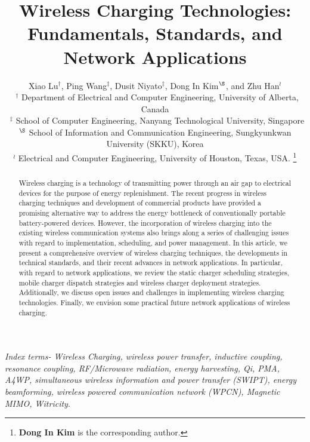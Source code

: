 \documentclass[twocolumn,10pt]{IEEEtran}
\begin{document}
\title{Wireless Charging Technologies: Fundamentals, Standards, and Network Applications}
 \author{ Xiao Lu$^{\dagger}$, Ping Wang$^{\ddagger}$,  Dusit Niyato$^{\ddagger}$, Dong In Kim$^{\S}$, and Zhu Han$^{\wr}$\\
 ~$^{\dagger}$ Department of Electrical and Computer Engineering, University of Alberta, Canada \\
    ~$^{\ddagger}$ School of Computer Engineering, Nanyang Technological University, Singapore \\
    $^{\S}$  School of Information and Communication Engineering, Sungkyunkwan University (SKKU), Korea \\
    $^{\wr}$  Electrical and Computer Engineering, University of Houston, Texas, USA.
    \thanks{ {\bf Dong In Kim} is the corresponding author.}
   }
   
    
    
\maketitle
\begin{abstract}
 
Wireless charging is a technology of transmitting power through an air gap to electrical devices for the purpose of energy replenishment. The recent progress in wireless charging techniques and development of commercial products have provided a promising alternative way to address the energy bottleneck of conventionally portable battery-powered devices. However, the incorporation of wireless charging into the existing wireless communication systems also brings along a series of challenging issues with regard to implementation, scheduling, and power management. In this article, we present a comprehensive overview of wireless charging techniques, the developments in technical standards, and their recent advances in network applications. In particular, with regard to network applications, we review the static charger scheduling strategies, mobile charger dispatch strategies and wireless charger deployment strategies. Additionally, we discuss open issues and challenges in implementing wireless charging technologies. Finally, we envision some practical future network applications of wireless charging.
 
\end{abstract}

\emph{Index terms- Wireless Charging, wireless power transfer, inductive coupling, resonance coupling, RF/Microwave radiation, energy harvesting, Qi, PMA, A4WP, simultaneous wireless information and power transfer (SWIPT), energy beamforming, wireless powered communication network (WPCN), Magnetic MIMO, Witricity}. 
\end{document}
